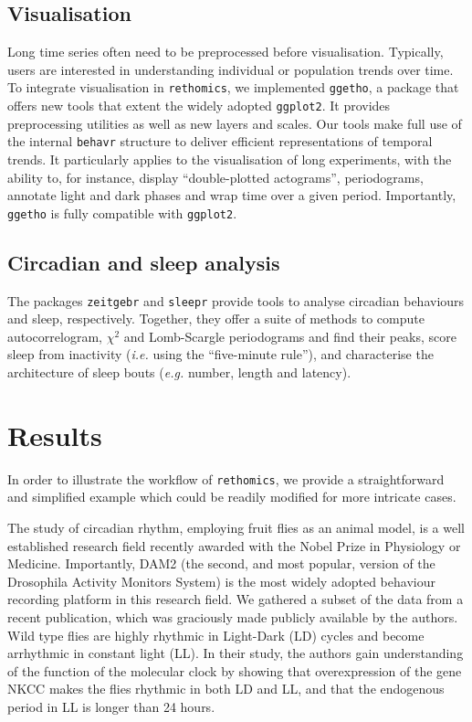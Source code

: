 \documentclass[10pt,letterpaper]{article}\usepackage[]{graphicx}\usepackage[]{color}
\begin{document}
\subsection*{Visualisation}
Long time series often need to be preprocessed before visualisation.
Typically, users are interested in understanding individual or population trends over time.
To integrate visualisation in \texttt{rethomics}, we implemented \texttt{ggetho},
a package that offers new tools that extent the widely adopted \texttt{ggplot2}\cite{wickham_ggplot2:_2016}.
It provides preprocessing utilities as well as new layers and scales.
Our tools make full use of the internal \texttt{behavr} structure to deliver efficient representations of temporal trends.
It particularly applies to the visualisation of long experiments, with the ability to, for instance, display ``double-plotted actograms'', periodograms, annotate light and dark phases and wrap time over a given period. 
Importantly, \texttt{ggetho} is fully compatible with \texttt{ggplot2}.

\subsection*{Circadian and sleep analysis}
The packages \texttt{zeitgebr} and \texttt{sleepr} provide tools to analyse circadian behaviours and sleep, respectively.
Together, they offer a suite of methods to compute autocorrelogram, $\chi{}^2$\cite{sokolove_chi_1978} and Lomb-Scargle\cite{ruf_lomb-scargle_1999}
periodograms and find their peaks, score sleep from inactivity (\emph{i.e.} using the ``five-minute rule''), and characterise the architecture of sleep bouts (\emph{e.g.} number, length and latency).







\section*{Results}
In order to illustrate the workflow of \texttt{rethomics}, we provide a straightforward and simplified example which could be readily modified for more intricate cases. 

The study of circadian rhythm, employing fruit flies as an animal model, is a well established research field recently awarded with the Nobel Prize in Physiology or Medicine.
Importantly, DAM2 (the second, and most popular, version of the Drosophila Activity Monitors System) is the most widely adopted behaviour recording platform in this research field.
We gathered a subset of the data from a recent publication\cite{buhl_quasimodo_2016}, which was graciously made publicly available by the authors\cite{ogueta_ll_2018}.
Wild type flies are highly rhythmic in Light-Dark (LD) cycles and become arrhythmic in constant light (LL).
In their study, the authors gain understanding of the function of the molecular clock by showing that overexpression of the gene NKCC makes the flies rhythmic in both LD and LL,
and that the endogenous period in LL is longer than 24 hours.
\end{document}

